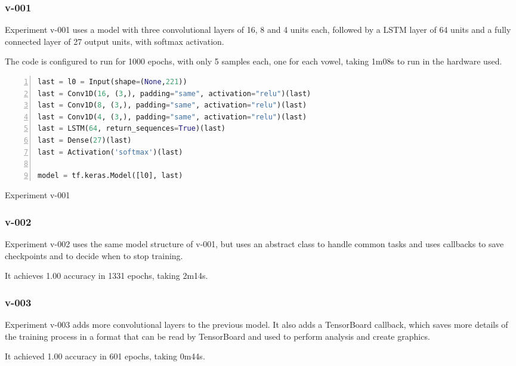 \subsubsection{v-001}

Experiment v-001 uses a model with three convolutional layers of 16, 8 and 4 units each, followed by a LSTM layer of 64 units and a fully connected layer of 27 output units, with softmax activation.

The code is configured to run for 1000 epochs, with only 5 samples each, one for each vowel, taking 1m08s to run in the hardware used.

\noindent
\begin{algorithm}
\begin{lstlisting}[language=Python, frame=single, numbers=left]
last = l0 = Input(shape=(None,221))
last = Conv1D(16, (3,), padding="same", activation="relu")(last)
last = Conv1D(8, (3,), padding="same", activation="relu")(last)
last = Conv1D(4, (3,), padding="same", activation="relu")(last)
last = LSTM(64, return_sequences=True)(last)
last = Dense(27)(last)
last = Activation('softmax')(last)

model = tf.keras.Model([l0], last)
\end{lstlisting}
\caption{\label{alg:v001}Experiment v-001}
\end{algorithm}

\subsubsection{v-002}
Experiment v-002 uses the same model structure of v-001, but uses an abstract class to handle common tasks and uses callbacks to save checkpoints and to decide when to stop training.

It achieves 1.00 accuracy in 1331 epochs, taking 2m14s.

\subsubsection{v-003}

Experiment v-003 adds more convolutional layers to the previous model.  It also adds a TensorBoard callback, which saves more details of the training process in a format that can be read by TensorBoard and used to perform analysis and create graphics.

It achieved 1.00 accuracy in 601 epochs, taking 0m44s.

